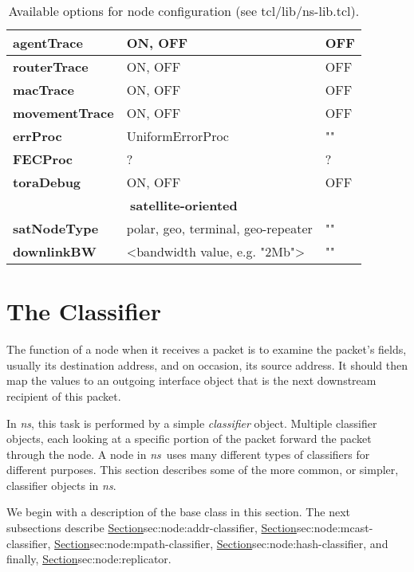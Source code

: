 \begin{table}[ht]
\begin{center}
{\begin{tabular}{|l|l|l|}
{\bf agentTrace} & ON, OFF & OFF \\\hline
{\bf routerTrace} & ON, OFF & OFF \\\hline
{\bf macTrace} & ON, OFF & OFF \\\hline
{\bf movementTrace} & ON, OFF & OFF \\\hline
{\bf errProc} & UniformErrorProc & "" \\\hline
{\bf FECProc} &? & ? \\\hline
{\bf toraDebug} & ON, OFF & OFF \\\hline
\multicolumn{3}{|c|}{\bf satellite-oriented} \\\hline
{\bf satNodeType} & polar, geo, terminal, geo-repeater & "" \\\hline
{\bf downlinkBW} & <bandwidth value, e.g. "2Mb"> & ""\\\hline
\end{tabular}
}
\end{center}
\caption{Available options for node configuration (see tcl/lib/ns-lib.tcl).
}
\end{table}
\normalsize

\section{The Classifier}
\label{sec:node:classifiers}

The function of a node when it receives a packet is to examine
the packet's fields, usually its destination address, and
on occasion, its source address.
It should then map the values to an outgoing interface object
that is the next downstream recipient of this packet.

In \emph{ns}, this task is performed by a simple \emph{classifier} object.
Multiple classifier objects,
each looking at a specific portion of the packet
forward the packet through the node.
A node in \emph{ns}\ uses many different types of classifiers for different purposes.
This section describes some of the more common, or simpler,
classifier objects in \emph{ns}.

We begin with a description of the base class in this section.
The next subsections describe
\href{the address classifier}{Section}{sec:node:addr-classifier},
\href{the multicast classifier}{Section}{sec:node:mcast-classifier},
\href{the multipath classifier}{Section}{sec:node:mpath-classifier}, 
\href{the hash classifier}{Section}{sec:node:hash-classifier}, and
finally, \href{the replicator}{Section}{sec:node:replicator}.

